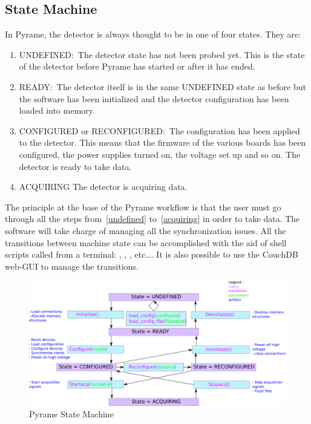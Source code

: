 \subsection{State Machine}
In Pyrame, the detector is always thought to be in one of four states. They are:
\begin{enumerate}
\item\label{undefined} UNDEFINED:\ The detector state has not been probed
  yet. This is the state of the detector before Pyrame has started or after it
  has ended.
\item READY:\ The detector itself is in the same UNDEFINED state as before but
  the software has been initialized and the detector configuration has been
  loaded into memory.
\item CONFIGURED or RECONFIGURED:\ The configuration has been applied to the
  detector. This means that the firmware of the various boards has been
  configured, the power supplies turned on, the voltage set up and so on. The
  detector is ready to take data.
\item\label{acquiring} ACQUIRING The detector is acquiring data.
\end{enumerate}
The principle at the base of the Pyrame workflow is that the user must go
through all the steps from~\ref{undefined} to~\ref{acquiring} in order to take
data. The software will take charge of managing all the synchronization issues.
All the transitions between machine state can be accomplished with the aid of
shell scripts called from a terminal: ,
, , etc\dots. It is also
possible to use the CouchDB web-GUI to manage the transitions.
\begin{figure}
  \includegraphics[frame,width=\linewidth]{state_machine.doc.png}
  \caption{Pyrame State Machine}\label{fig:state-machine}
\end{figure}


